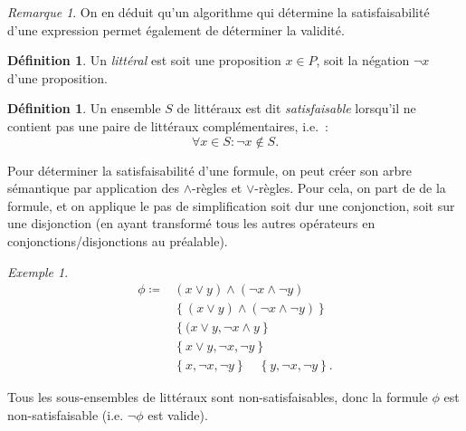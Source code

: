\documentclass{article}
\theoremstyle{definition}
\newtheorem{déf}[thm]{Définition}
\theoremstyle{remark}
\newtheorem*{rmq}{Remarque}
\newtheorem{ex}{Exemple}[section]
\begin{document}
	\begin{rmq} On en déduit qu'un algorithme qui détermine la satisfaisabilité d'une expression permet également de déterminer la validité.
	\end{rmq}

	\begin{déf} Un \textit{littéral} est soit une proposition $x \in P$, soit la négation $\lnot x$ d'une proposition.
	\end{déf}

	\begin{déf} Un ensemble $S$ de littéraux est dit \textit{satisfaisable} lorsqu'il ne contient pas une paire de littéraux complémentaires, i.e.~:
	\[\forall x \in S : \lnot x \not \in S.\]
	\end{déf}

	Pour déterminer la satisfaisabilité d'une formule, on peut créer son arbre sémantique par application des $\land$-règles et $\lor$-règles. Pour cela,
	on part de de la formule, et on applique le pas de simplification soit dur une conjonction, soit sur une disjonction (en ayant transformé tous les
	autres opérateurs en conjonctions/disjonctions au préalable).

	\begin{ex}
	\begin{align*}
		\phi \coloneqq &(x \lor y) \land (\lnot x \land \lnot y) \\
		&\left\{(x \lor y) \land (\lnot x \land \lnot y)\right\} \\
		&\left\{(x \lor y, \lnot x \land y\right\} \\
		&\left\{x \lor y, \lnot x, \lnot y\right\} \\
		&\left\{x, \lnot x, \lnot y\right\} \quad  \left\{y, \lnot x, \lnot y\right\}.
	\end{align*}

	Tous les sous-ensembles de littéraux sont non-satisfaisables, donc la formule $\phi$ est non-satisfaisable (i.e. $\lnot \phi$ est valide).
	\end{ex}
\end{document}
